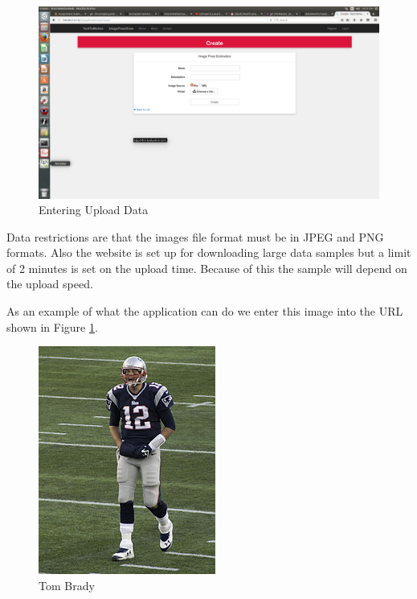 \documentclass{scrreprt}
\begin{document}
\begin{figure}
  \includegraphics[width=\linewidth]{greenButtonPage.png}
  \caption{Entering Upload Data}
  \label{fig:uploadPage}
\end{figure}

Data restrictions are that the images file format must be in JPEG and PNG
formats.  Also the website is set up for downloading large data samples but a
limit of 2 minutes is set on the upload time.  Because of this the sample will
depend on the upload speed.

As an example of what the application can do we enter this image into the URL
shown in Figure \ref{fig:uploadPage}.

\begin{figure}
  \includegraphics[width=\linewidth]{tbrady.jpg}
  \caption{Tom Brady}
  \label{fig:tomBrady}
\end{figure}
\end{document}
